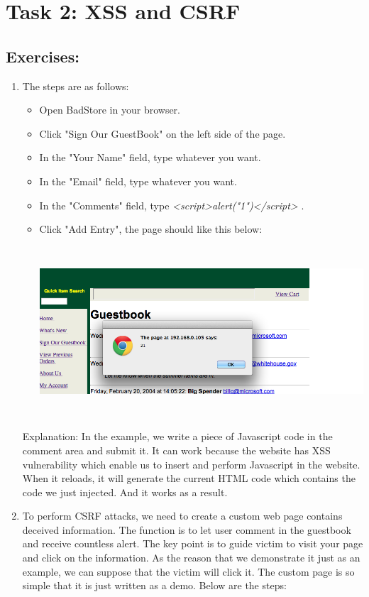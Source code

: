 \section*{Task 2: XSS and CSRF}
\subsection*{Exercises:}
\begin{enumerate}
\item The steps are as follows: 
	\begin{itemize}
		\item Open BadStore in your browser.
		\item Click "Sign Our GuestBook" on the left side of the page.
		\item In the "Your Name" field, type whatever you want.
		\item In the "Email" field, type whatever you want.
		\item In the "Comments" field, type \textit{<script>alert("1")</script>} .
		\item Click "Add Entry", the page should like this below:
		\par
		\begin{center}\includegraphics[height=2.5in]{xss}
		\end{center}
	\end{itemize}
	\indent Explanation: In the example, we write a piece of Javascript code in the comment area and submit it. It can work because the website has XSS vulnerability which enable us to insert and perform Javascript in the website. When it reloads, it will generate the current HTML code which contains the code we just injected. And it works as a result.
	\item To perform CSRF attacks, we need to create a custom web page contains deceived information. The function is to let user comment in the guestbook and receive countless alert. The key point is to guide victim to visit your page and click on the information. As the reason that we demonstrate it just as an example, we can suppose that the victim will click it. The custom page is so simple that it is just written as a demo. Below are the steps:

\end{enumerate}
